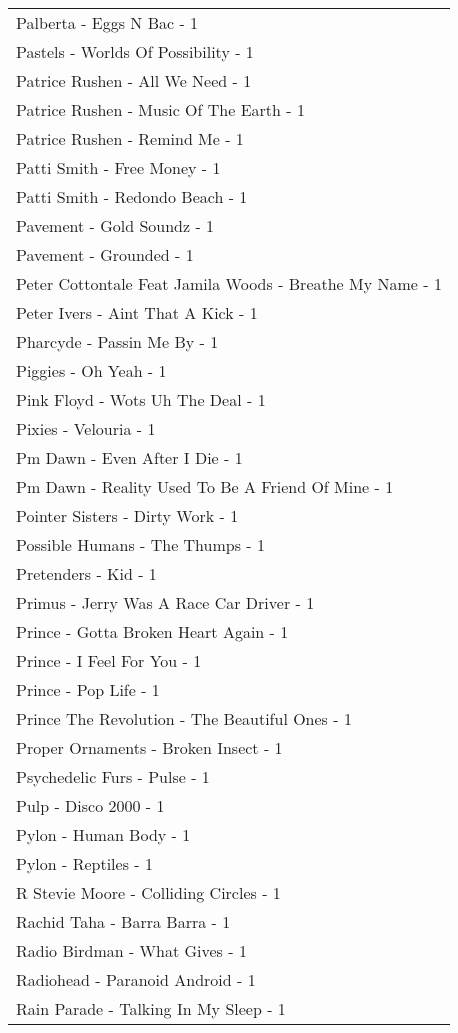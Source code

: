 \documentclass[
]{article}
\begin{document}
\begin{longtable}{l}
Palberta - Eggs N Bac - 1 \\ 
Pastels - Worlds Of Possibility - 1 \\ 
Patrice Rushen - All We Need - 1 \\ 
Patrice Rushen - Music Of The Earth - 1 \\ 
Patrice Rushen - Remind Me - 1 \\ 
Patti Smith - Free Money - 1 \\ 
Patti Smith - Redondo Beach - 1 \\ 
Pavement - Gold Soundz - 1 \\ 
Pavement - Grounded - 1 \\ 
Peter Cottontale Feat Jamila Woods - Breathe My Name - 1 \\ 
Peter Ivers - Aint That A Kick - 1 \\ 
Pharcyde - Passin Me By - 1 \\ 
Piggies - Oh Yeah - 1 \\ 
Pink Floyd - Wots Uh The Deal - 1 \\ 
Pixies - Velouria - 1 \\ 
Pm Dawn - Even After I Die - 1 \\ 
Pm Dawn - Reality Used To Be A Friend Of Mine - 1 \\ 
Pointer Sisters - Dirty Work - 1 \\ 
Possible Humans - The Thumps - 1 \\ 
Pretenders - Kid - 1 \\ 
Primus - Jerry Was A Race Car Driver - 1 \\ 
Prince - Gotta Broken Heart Again - 1 \\ 
Prince - I Feel For You - 1 \\ 
Prince - Pop Life - 1 \\ 
Prince The Revolution - The Beautiful Ones - 1 \\ 
Proper Ornaments - Broken Insect - 1 \\ 
Psychedelic Furs - Pulse - 1 \\ 
Pulp - Disco 2000 - 1 \\ 
Pylon - Human Body - 1 \\ 
Pylon - Reptiles - 1 \\ 
R Stevie Moore - Colliding Circles - 1 \\ 
Rachid Taha - Barra Barra - 1 \\ 
Radio Birdman - What Gives - 1 \\ 
Radiohead - Paranoid Android - 1 \\ 
Rain Parade - Talking In My Sleep - 1 \\ 

\end{longtable}
\end{document}
